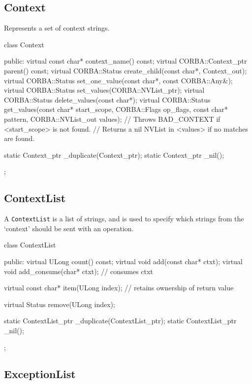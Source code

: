 \documentclass[11pt,twoside,a4paper]{book}
\newcommand{\type}[1]{\texttt{#1}}
\begin{document}
\subsection{Context}

Represents a set of context strings.

\begin{cxxlisting}
class Context {
public:
  virtual const char* context_name() const;
  virtual CORBA::Context_ptr parent() const;
  virtual CORBA::Status create_child(const char*, Context_out);
  virtual CORBA::Status set_one_value(const char*, const CORBA::Any&);
  virtual CORBA::Status set_values(CORBA::NVList_ptr);
  virtual CORBA::Status delete_values(const char*);
  virtual CORBA::Status get_values(const char* start_scope,
                                   CORBA::Flags op_flags,
                                   const char* pattern,
                                   CORBA::NVList_out values);
  // Throws BAD_CONTEXT if <start_scope> is not found.
  // Returns a nil NVList in <values> if no matches are found.

  static Context_ptr _duplicate(Context_ptr);
  static Context_ptr _nil();
};
\end{cxxlisting}


\subsection{ContextList}

A \type{ContextList} is a list of strings, and is used to specify
which strings from the `context' should be sent with an operation.

\begin{cxxlisting}
class ContextList {
public:
  virtual ULong count() const;
  virtual void add(const char* ctxt);
  virtual void add_consume(char* ctxt);
  // consumes ctxt

  virtual const char* item(ULong index);
  // retains ownership of return value

  virtual Status remove(ULong index);

  static ContextList_ptr _duplicate(ContextList_ptr);
  static ContextList_ptr _nil();
};
\end{cxxlisting}



\subsection{ExceptionList}
\end{document}
